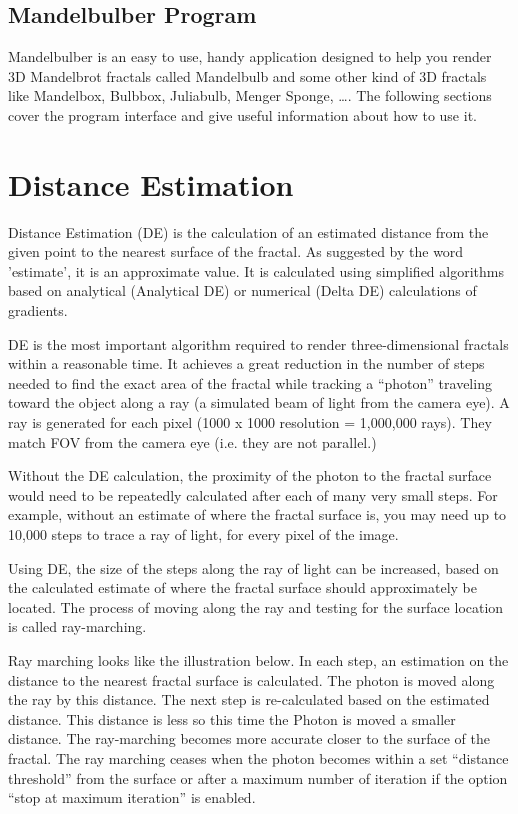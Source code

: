 \subsection{Mandelbulber Program}\label{mandelbulber-program}

Mandelbulber is an easy to use, handy application designed to help you
render 3D Mandelbrot fractals called Mandelbulb and some other kind of
3D fractals like Mandelbox, Bulbbox, Juliabulb, Menger Sponge, \ldots{}.
The following sections cover the program interface and give useful
information about how to use it.

\section{Distance Estimation}\label{distance-estimation}

Distance Estimation (DE) is the calculation of an estimated distance
from the given point to the nearest surface of the fractal. As suggested
by the word 'estimate', it is an approximate value. It is calculated
using simplified algorithms based on analytical (Analytical DE) or
numerical (Delta DE) calculations of gradients.

DE is the most important algorithm required to render three-dimensional
fractals within a reasonable time. It achieves a great reduction in the
number of steps needed to find the exact area of the fractal while
tracking a ``photon'' traveling toward the object along a ray (a
simulated beam of light from the camera eye). A ray is generated for
each pixel (1000 x 1000 resolution = 1,000,000 rays). They match FOV
from the camera eye (i.e. they are not parallel.)

Without the DE calculation, the proximity of the photon to the fractal
surface would need to be repeatedly calculated after each of many very
small steps. For example, without an estimate of where the fractal
surface is, you may need up to 10,000 steps to trace a ray of light, for
every pixel of the image.

Using DE, the size of the steps along the ray of light can be increased,
based on the calculated estimate of where the fractal surface should
approximately be located. The process of moving along the ray and
testing for the surface location is called ray-marching.

Ray marching looks like the illustration below. In each step, an
estimation on the distance to the nearest fractal surface is calculated.
The photon is moved along the ray by this distance. The next step is
re-calculated based on the estimated distance. This distance is less so
this time the Photon is moved a smaller distance. The ray-marching
becomes more accurate closer to the surface of the fractal. The ray
marching ceases when the photon becomes within a set ``distance
threshold'' from the surface or after a maximum number of iteration if
the option ``stop at maximum iteration'' is enabled.

